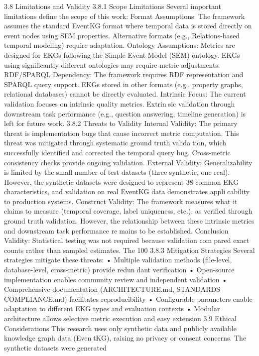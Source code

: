 3.8 Limitations and Validity
3.8.1 Scope Limitations
Several important limitations define the scope of this work:
Format Assumptions: The framework assumes the standard EventKG format
where temporal data is stored directly on event nodes using SEM properties. Alternative
formats (e.g., Relations-based temporal modeling) require adaptation.
Ontology Assumptions: Metrics are designed for EKGs following the Simple Event
Model (SEM) ontology. EKGs using significantly different ontologies may require metric
adjustments.
RDF/SPARQL Dependency: The framework requires RDF representation and
SPARQL query support. EKGs stored in other formats (e.g., property graphs, relational
databases) cannot be directly evaluated.
Intrinsic Focus: The current validation focuses on intrinsic quality metrics. Extrinsic validation through downstream task performance (e.g., question answering, timeline
generation) is left for future work.
3.8.2 Threats to Validity
Internal Validity: The primary threat is implementation bugs that cause incorrect
metric computation. This threat was mitigated through systematic ground truth validation, which successfully identified and corrected the temporal query bug. Cross-metric
consistency checks provide ongoing validation.
External Validity: Generalizability is limited by the small number of test datasets
(three synthetic, one real). However, the synthetic datasets were designed to represent
38
common EKG characteristics, and validation on real EventKG data demonstrates applicability to production systems.
Construct Validity: The framework measures what it claims to measure (temporal
coverage, label uniqueness, etc.), as verified through ground truth validation. However,
the relationship between these intrinsic metrics and downstream task performance remains to be established.
Conclusion Validity: Statistical testing was not required because validation compared exact counts rather than sampled estimates. The 100%
3.8.3 Mitigation Strategies
Several strategies mitigate these threats:
• Multiple validation methods (file-level, database-level, cross-metric) provide redundant verification
• Open-source implementation enables community review and independent validation
• Comprehensive documentation (ARCHITECTURE.md, STANDARDS COMPLIANCE.md)
facilitates reproducibility
• Configurable parameters enable adaptation to different EKG types and evaluation
contexts
• Modular architecture allows selective metric execution and easy extension
3.9 Ethical Considerations
This research uses only synthetic data and publicly available knowledge graph data (EventKG), raising no privacy or consent concerns. The synthetic datasets were generated
